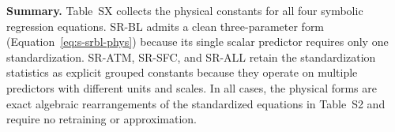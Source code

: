 
\vspace{1.0em}
\textbf{Summary.}
Table~SX collects the physical constants for all four symbolic regression
equations.  SR-BL admits a clean three-parameter form (Equation~\ref{eq:s-srbl-phys})
because its single scalar predictor requires only one standardization.  SR-ATM,
SR-SFC, and SR-ALL retain the standardization statistics as explicit grouped
constants because they operate on multiple predictors with different units and
scales.  In all cases, the physical forms are exact algebraic rearrangements of
the standardized equations in Table~S2 and require no retraining or
approximation.

%

